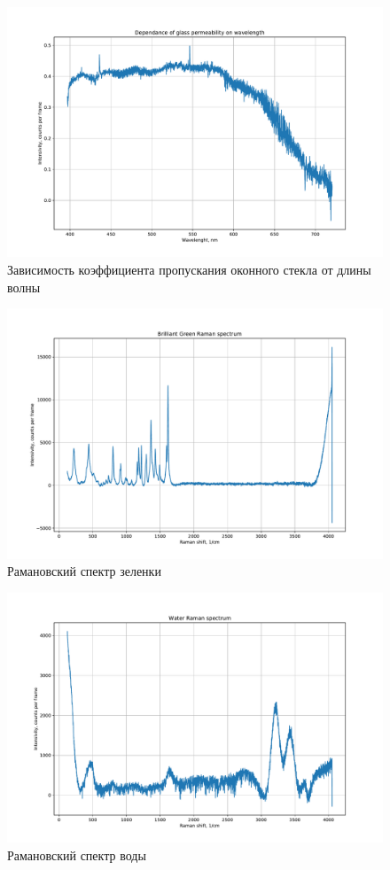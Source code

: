 \documentclass[a4paper, 12pt]{article}
\begin{document}
\begin{figure}[H]
	\centering
	\includegraphics[width=0.9\linewidth]{glass_permeability}
	\caption{Зависимость коэффициента пропускания оконного стекла от длины волны}
	\label{fig:glass_perm}
\end{figure}


\begin{figure}[H]
	\centering
	\includegraphics[width=0.9\linewidth]{raman_brilliant_green}
	\caption{Рамановский спектр зеленки}
	\label{fig:br_gr}
\end{figure}

\begin{figure}[H]
	\centering
	\includegraphics[width=0.9\linewidth]{raman_water}
	\caption{Рамановский спектр воды}
	\label{fig:water}
\end{figure}
\end{document}
